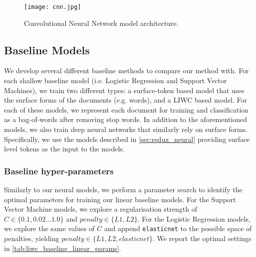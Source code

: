 \begin{figure}
  \centering
  \texttt{[image: cnn.jpg]}
  \caption{Convolutional Neural Network model architecture.}
  \label{fig:liwc_cnn}
\end{figure}

\subsection{Baseline Models}

We develop several different baseline methods to compare our method with. For each shallow baseline model (i.e. Logistic Regression and Support Vector Machines), we train two different types: a surface-token based model that uses the surface forms of the documents (e.g. words), and a LIWC based model. For each of these models, we represent each document for training and classification as a bag-of-words after removing stop words. In addition to the aforementioned models, we also train deep neural networks that similarly rely on surface forms. Specifically, we use the models described in \autoref{sec:redux_neural} providing surface level tokens as the input to the models.

\subsubsection{Baseline hyper-parameters}

Similarly to our neural models, we perform a parameter search to identify the optimal parameters for training our linear baseline models. For the Support Vector Machine models, we explore a regularisation strength of $C \in \{0.1, 0.02 \ldots 1.0\}$ and $penalty \in \{L1, L2\}$. For the Logistic Regression models, we explore the same values of $C$ and append \texttt{elasticnet} to the possible space of penalties, yielding $penalty \in \{L1, L2, elasticnet\}$. We report the optimal settings in \autoref{tab:liwc_baseline_linear_params}.

